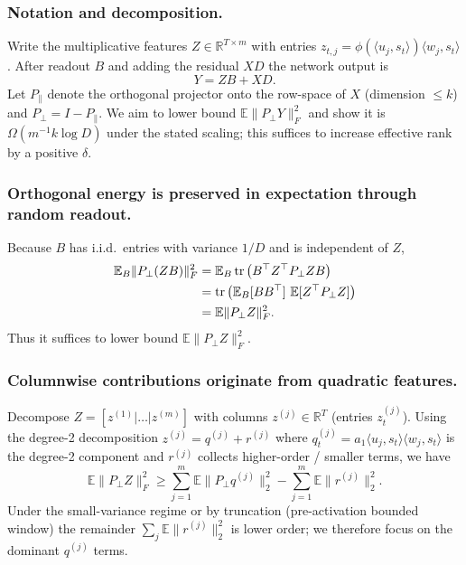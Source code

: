 \documentclass[sigconf,screen]{acmart}
\begin{document}
\subsubsection*{\bf Notation and decomposition.} Write the multiplicative features \(Z\in\mathbb R^{T\times m}\) with entries \(z_{t,j}=\phi(\langle u_j,s_t\rangle)\langle w_j,s_t\rangle\). After readout \(B\) and adding the residual \(XD\) the network output is
\[
Y = ZB + X D.
\]
Let \(P_\parallel\) denote the orthogonal projector onto the row-space of \(X\) (dimension \(\le k\)) and \(P_\perp = I - P_\parallel\). We aim to lower bound \(\mathbb E\|P_\perp Y\|_F^2\) and show it is \(\Omega(m^{-1} k\log D)\) under the stated scaling; this suffices to increase effective rank by a positive \(\delta\).

\subsubsection*{\bf Orthogonal energy is preserved in expectation through random readout.}  
Because \(B\) has i.i.d.\ entries with variance \(1/D\) and is independent of \(Z\),
\begin{align}
\mathbb E_B\|P_\perp (ZB)\|_F^2
&= \mathbb E_B\operatorname{tr}\big(B^\top Z^\top P_\perp Z B\big) \notag\\
&= \operatorname{tr}\big(\mathbb E_B[B B^\top]\ \mathbb E[Z^\top P_\perp Z]\big) \notag\\
&= \mathbb E\|P_\perp Z\|_F^2. 
\end{align}
Thus it suffices to lower bound \(\mathbb E\|P_\perp Z\|_F^2\).

\subsubsection*{\bf Columnwise contributions originate from quadratic features.}  
Decompose \(Z=[z^{(1)}|\dots|z^{(m)}]\) with columns \(z^{(j)}\in\mathbb R^T\) (entries \(z^{(j)}_t\)). Using the degree-2 decomposition \(z^{(j)} = q^{(j)} + r^{(j)}\) where \(q^{(j)}_t = a_1\langle u_j,s_t\rangle\langle w_j,s_t\rangle\) is the degree-2 component and \(r^{(j)}\) collects higher-order / smaller terms, we have
\[
\mathbb E\|P_\perp Z\|_F^2
\ge
\sum_{j=1}^m \mathbb E\|P_\perp q^{(j)}\|_2^2 - \sum_{j=1}^m \mathbb E\|r^{(j)}\|_2^2.
\]
Under the small-variance regime or by truncation (pre-activation bounded window) the remainder \(\sum_j \mathbb E\|r^{(j)}\|_2^2\) is lower order; we therefore focus on the dominant \(q^{(j)}\) terms.
\end{document}
